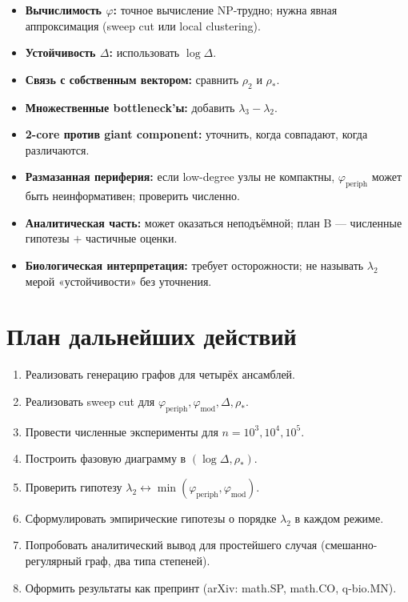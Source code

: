 \documentclass[11pt,a4paper]{article}
\theoremstyle{plain}
\theoremstyle{definition}
\theoremstyle{remark}
\newcommand{\periph}{\mathrm{periph}}
\newcommand{\modu}{\mathrm{mod}}
\newcommand{\Ph}{\varphi}
\newcommand{\lamtwo}{\lambda_2}
\newcommand{\lamthree}{\lambda_3}
\begin{document}
\begin{itemize}[leftmargin=*]
\item \textbf{Вычислимость $\Ph$:} точное вычисление NP-трудно; нужна явная
аппроксимация (sweep cut или local clustering).
\item \textbf{Устойчивость $\Delta$:} использовать $\log\Delta$.
\item \textbf{Связь с собственным вектором:} сравнить $\rho_2$ и $\rho_*$.
\item \textbf{Множественные bottleneck'ы:} добавить $\lamthree-\lamtwo$.
\item \textbf{2-core против giant component:} уточнить, когда совпадают, когда
различаются.
\item \textbf{Размазанная периферия:} если low-degree узлы не компактны,
$\Ph_{\periph}$ может быть неинформативен; проверить численно.
\item \textbf{Аналитическая часть:} может оказаться неподъёмной; план B ---
численные гипотезы $+$ частичные оценки.
\item \textbf{Биологическая интерпретация:} требует осторожности; не называть
$\lamtwo$ мерой «устойчивости» без уточнения.
\end{itemize}

\section{План дальнейших действий}
\label{sec:plan}

\begin{enumerate}[leftmargin=*]
\item Реализовать генерацию графов для четырёх ансамблей.
\item Реализовать sweep cut для $\Ph_{\periph},\Ph_{\modu},\Delta,\rho_*$.
\item Провести численные эксперименты для $n=10^3,10^4,10^5$.
\item Построить фазовую диаграмму в $(\log\Delta,\rho_*)$.
\item Проверить гипотезу
$\lamtwo\leftrightarrow\min(\Ph_{\periph},\Ph_{\modu})$.
\item Сформулировать эмпирические гипотезы о порядке $\lamtwo$ в каждом режиме.
\item Попробовать аналитический вывод для простейшего случая
(смешанно-регулярный граф, два типа степеней).
\item Оформить результаты как препринт (arXiv: math.SP, math.CO, q-bio.MN).
\end{enumerate}
\end{document}
